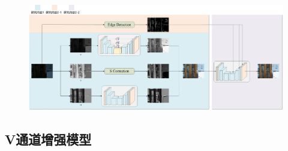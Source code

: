 \documentclass[CJK,aspectratio=169]{beamer}  %
\begin{document}
	\begin{frame}
		\begin{figure}[htbp]
			\begin{center}
				\includegraphics[width=\textwidth]{picture/LLIE/My Architecture/HSV Architecture}
			\end{center}
		\end{figure}
		
	\end{frame}
	
	\subsection{V通道增强模型}
	
\end{document}
